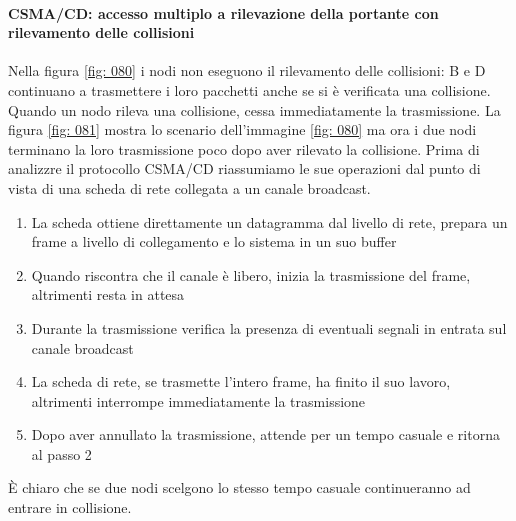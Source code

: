 \documentclass[11pt,a4paper]{book}
\begin{document}
\paragraph{CSMA/CD: accesso multiplo a rilevazione della portante con rilevamento delle collisioni} \label{par: CSMA/CD}
Nella figura \ref{fig: 080} i nodi non eseguono il rilevamento delle collisioni: B e D continuano a trasmettere i loro pacchetti anche se si è verificata una collisione. Quando un nodo rileva una collisione, cessa immediatamente la trasmissione. La figura \ref{fig: 081} mostra lo scenario dell'immagine \ref{fig: 080} ma ora i due nodi terminano la loro trasmissione poco dopo aver rilevato la collisione. Prima di analizzre il protocollo CSMA/CD riassumiamo le sue operazioni dal punto di vista di una scheda di rete collegata a un canale broadcast.
\begin{enumerate}
	\item La scheda ottiene direttamente un datagramma dal livello di rete, prepara un frame a livello di collegamento e lo sistema in un suo buffer
	\item Quando riscontra che il canale è libero, inizia la trasmissione del frame, altrimenti resta in attesa
	\item Durante la trasmissione verifica la presenza di eventuali segnali in entrata sul canale broadcast
	\item La scheda di rete, se trasmette l'intero frame, ha finito il suo lavoro, altrimenti interrompe immediatamente la trasmissione
	\item Dopo aver annullato la trasmissione, attende per un tempo casuale e ritorna al passo 2
\end{enumerate}
È chiaro che se due nodi scelgono lo stesso tempo casuale continueranno ad entrare in collisione.
\end{document}
